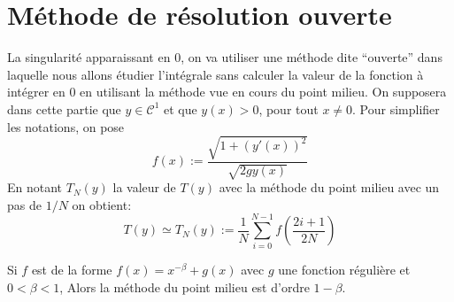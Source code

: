 \documentclass[a4paper,10pt]{article}
\begin{document}
\section{M\'ethode de r\'esolution ouverte}
La singularit\'e apparaissant en 0, on va utiliser une m\'ethode dite ``ouverte'' dans laquelle nous allons \'etudier l'int\'egrale sans calculer la valeur de la fonction \`a int\'egrer en 0 en utilisant
la m\'ethode vue en cours du point milieu.
\newline
On supposera dans cette partie que $y\in \mathcal{C}^1$ et que $y(x) > 0$, pour tout $x \neq 0$.
Pour simplifier les notations, on pose
\begin{equation}
 f(x) := \frac{\sqrt{1+(y'(x))^2}}{\sqrt{2gy(x)}}
\end{equation}
En notant $T_N(y)$ la valeur de $T(y)$ avec la m\'ethode du point milieu avec un pas de $1/N$ on obtient:
\begin{equation}
 T(y) \simeq T_N(y) := \frac{1}{N}\sum_{i = 0}^{N-1} f(\frac{2i + 1}{2N})
\end{equation}
\begin{theorem}
 Si $f$ est de la forme $f(x) = x^{-\beta} + g(x)$ avec $g$ une fonction r\'eguli\`ere et $0 < \beta < 1$, Alors la m\'ethode du point milieu est d'ordre $1 - \beta$. 
\end{theorem}
\end{document}
